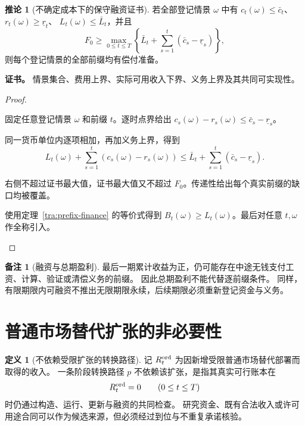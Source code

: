 \documentclass[UTF8,12pt,a4paper,openany,fontset=none,zihao=false]{ctexrep}
\theoremstyle{definition}
\newtheorem{definition}{定义}[chapter]
\newtheorem{corollary}{推论}[chapter]
\newtheorem{remark}{备注}[chapter]
\newenvironment{certificate}{\par\noindent\textbf{证书。}\ignorespaces}{\par}
\newcommand{\1}{\mathbf 1}
\begin{document}
\begin{corollary}[不确定成本下的保守融资证书]
\label{tra:robust-finance}
若全部登记情景 \(\omega\) 中有 \(c_t(\omega)\le\bar c_t\)、\(r_t(\omega)\ge\underline r_t\)、
\(L_t(\omega)\le\bar L_t\)，并且
\[
F_0\ge\max_{0\le t\le T}
\left\{\bar L_t+\sum_{s=1}^t(\bar c_s-\underline r_s)\right\},
\]
则每个登记情景的全部前缀均有偿付准备。
\end{corollary}
\begin{certificate}
情景集合、费用上界、实际可用收入下界、义务上界及其共同可实现性。
\end{certificate}
\begin{proof}
\begin{semanticsteps}
\item 固定任意登记情景 \(\omega\) 和前缀 \(t\)。逐时点界给出
\(c_s(\omega)-r_s(\omega)\le\bar c_s-\underline r_s\)。
\item 同一货币单位内逐项相加，再加义务上界，得到
\[
L_t(\omega)+\sum_{s=1}^{t}(c_s(\omega)-r_s(\omega))
\le\bar L_t+\sum_{s=1}^{t}(\bar c_s-\underline r_s).
\]
\item 右侧不超过证书最大值，证书最大值又不超过 \(F_0\)。传递性给出每个真实前缀的缺口均被覆盖。
\item 使用定理~\ref{tra:prefix-finance} 的等价式得到
\(B_t(\omega)\ge L_t(\omega)\)。最后对任意 \(t,\omega\) 作全称引入。
\end{semanticsteps}
\end{proof}

\begin{remark}[融资与总期盈利]
最后一期累计收益为正，仍可能存在中途无钱支付工资、计算、验证或清偿义务的前缀。
因此总期盈利不能代替逐前缀条件。
同样，有限期限内可融资不推出无限期限永续，后续期限必须重新登记资金与义务。
\end{remark}

\section{普通市场替代扩张的非必要性}

\begin{definition}[不依赖受限扩张的转换路径]
记 \(R_t^{\rm ord}\) 为因新增受限普通市场替代部署而取得的收入。
一条阶段转换路径 \(p\) 不依赖该扩张，是指其真实可行账本在
\[
R_t^{\rm ord}=0\qquad(0\le t\le T)
\]
时仍通过构造、运行、更新与融资的共同检查。
研究资金、既有合法收入或许可用途合同可以作为候选来源，但必须经过到位与不重复承诺核验。
\end{definition}
\end{document}
